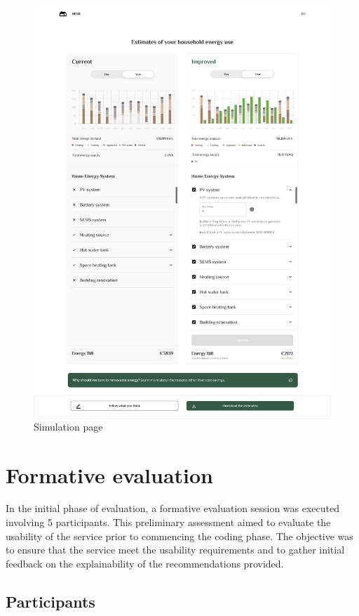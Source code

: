 \begin{figure}[h!]
  \centering
  \includegraphics[width=\textwidth]{Images/explanation.png}
  \caption{Simulation page}
  \label{fig:explanation}
\end{figure}


\section{Formative evaluation}

In the initial phase of evaluation, a formative evaluation session was executed involving 5 participants.
This preliminary assessment aimed to evaluate the usability of the service prior to commencing the coding phase. 
The objective was to ensure that the service meet the usability requirements and 
to gather initial feedback on the explainability of the recommendations provided. 


\subsection{Participants}

